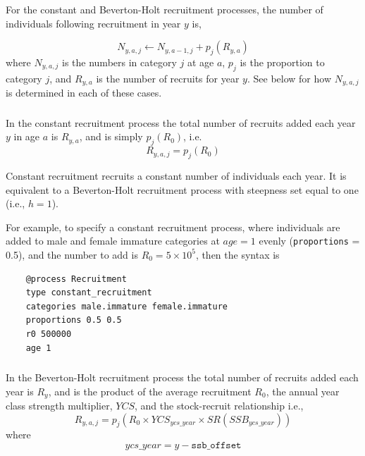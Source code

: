 For the constant and Beverton-Holt recruitment processes, the  number of individuals following recruitment in year $y$ is,  

\begin{equation}
N_{y,a,j} \leftarrow N_{y,a - 1,j} + p_j(R_{y,a})
\end{equation}
where $N_{y,a,j}$ is the numbers in category $j$ at age $a$, $p_j$ is the proportion to category $j$, and $R_{y,a}$ is the number of recruits for year $y$. See below for how $N_{y,a,j}$ is determined in each of these cases.

\subsubsection*{}

In the constant recruitment process the total number of recruits added each year $y$ in age $a$ is $R_{y,a}$, and is simply $p_j(R_0)$, i.e.
\begin{equation}
  R_{y,a,j} = p_j(R_0)
\end{equation}

Constant recruitment recruits a constant number of individuals each year. It is equivalent to a Beverton-Holt recruitment process with steepness set equal to one (i.e., $h=1$).

For example, to specify a constant recruitment process, where individuals are added to male and female immature categories at $age=1$ evenly (\texttt{proportions} = 0.5), and the number to add is $R_0=5 \times 10^5$, then the syntax is

{\small{\begin{verbatim}
	@process Recruitment
	type constant_recruitment
	categories male.immature female.immature
	proportions 0.5 0.5
	r0 500000
	age 1
\end{verbatim}}}

\subsubsection*{}

In the Beverton-Holt recruitment process the total number of recruits added each year is $R_y$, and is the product of the average recruitment $R_0$, the annual year class strength multiplier, $YCS$, and the stock-recruit relationship i.e.,
\begin{equation}\label{eq:BH}
  R_{y,a,j} = p_j(R_0 \times YCS_{ycs\_year} \times SR(SSB_{ycs\_year}))
\end{equation}
where
\begin{equation}\label{eq:year_class}
ycs\_year = y - \texttt{ssb\_offset}
\end{equation}

